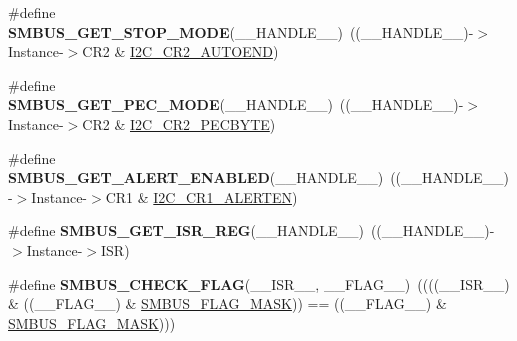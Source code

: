 \begin{DoxyCompactItemize}
\#define {\bfseries S\+M\+B\+U\+S\+\_\+\+G\+E\+T\+\_\+\+S\+T\+O\+P\+\_\+\+M\+O\+DE}(\+\_\+\+\_\+\+H\+A\+N\+D\+L\+E\+\_\+\+\_\+)~((\+\_\+\+\_\+\+H\+A\+N\+D\+L\+E\+\_\+\+\_\+)-\/$>$Instance-\/$>$C\+R2 \& \hyperlink{group___peripheral___registers___bits___definition_gabcf789c74e217ec8967bcabc156a6c54}{I2\+C\+\_\+\+C\+R2\+\_\+\+A\+U\+T\+O\+E\+ND})
\item 
\mbox{\label{group___s_m_b_u_s___private___macro_ga588cb2d814790d4a375f9dbcfff22647}} 
\#define {\bfseries S\+M\+B\+U\+S\+\_\+\+G\+E\+T\+\_\+\+P\+E\+C\+\_\+\+M\+O\+DE}(\+\_\+\+\_\+\+H\+A\+N\+D\+L\+E\+\_\+\+\_\+)~((\+\_\+\+\_\+\+H\+A\+N\+D\+L\+E\+\_\+\+\_\+)-\/$>$Instance-\/$>$C\+R2 \& \hyperlink{group___peripheral___registers___bits___definition_ga6989be2db6f3df41bf5cdb856b1a64c7}{I2\+C\+\_\+\+C\+R2\+\_\+\+P\+E\+C\+B\+Y\+TE})
\item 
\mbox{\label{group___s_m_b_u_s___private___macro_ga565aacbe2b3f0c3f529016073d6ef038}} 
\#define {\bfseries S\+M\+B\+U\+S\+\_\+\+G\+E\+T\+\_\+\+A\+L\+E\+R\+T\+\_\+\+E\+N\+A\+B\+L\+ED}(\+\_\+\+\_\+\+H\+A\+N\+D\+L\+E\+\_\+\+\_\+)~((\+\_\+\+\_\+\+H\+A\+N\+D\+L\+E\+\_\+\+\_\+)-\/$>$Instance-\/$>$C\+R1 \& \hyperlink{group___peripheral___registers___bits___definition_ga2062e827a9d1d14c8c1b58ad6dbbf762}{I2\+C\+\_\+\+C\+R1\+\_\+\+A\+L\+E\+R\+T\+EN})
\item 
\mbox{\label{group___s_m_b_u_s___private___macro_gab5da227a6597507c24cd42e382e759a6}} 
\#define {\bfseries S\+M\+B\+U\+S\+\_\+\+G\+E\+T\+\_\+\+I\+S\+R\+\_\+\+R\+EG}(\+\_\+\+\_\+\+H\+A\+N\+D\+L\+E\+\_\+\+\_\+)~((\+\_\+\+\_\+\+H\+A\+N\+D\+L\+E\+\_\+\+\_\+)-\/$>$Instance-\/$>$I\+SR)
\item 
\mbox{\label{group___s_m_b_u_s___private___macro_ga9f1a4a7fe3ecdfd8bdcc798ffd6c3c63}} 
\#define {\bfseries S\+M\+B\+U\+S\+\_\+\+C\+H\+E\+C\+K\+\_\+\+F\+L\+AG}(\+\_\+\+\_\+\+I\+S\+R\+\_\+\+\_\+,  \+\_\+\+\_\+\+F\+L\+A\+G\+\_\+\+\_\+)~((((\+\_\+\+\_\+\+I\+S\+R\+\_\+\+\_\+) \& ((\+\_\+\+\_\+\+F\+L\+A\+G\+\_\+\+\_\+) \& \hyperlink{group___s_m_b_u_s___exported___macros_gabcc8df77313f2c6eb892d197da66a79e}{S\+M\+B\+U\+S\+\_\+\+F\+L\+A\+G\+\_\+\+M\+A\+SK})) == ((\+\_\+\+\_\+\+F\+L\+A\+G\+\_\+\+\_\+) \& \hyperlink{group___s_m_b_u_s___exported___macros_gabcc8df77313f2c6eb892d197da66a79e}{S\+M\+B\+U\+S\+\_\+\+F\+L\+A\+G\+\_\+\+M\+A\+SK})))

\end{DoxyCompactItemize}
